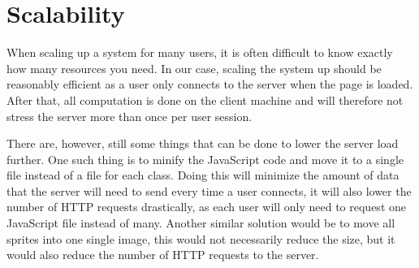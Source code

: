 \section{Scalability}
When scaling up a system for many users, it is often difficult to know exactly how many resources you need. In our case, scaling the system up should be reasonably efficient as a user only connects to the server when the page is loaded. After that, all computation is done on the client machine and will therefore not stress the server more than once per user session.\newline

There are, however, still some things that can be done to lower the server load further. One such thing is to minify the JavaScript code and move it to a single file instead of a file for each class. Doing this will minimize the amount of data that the server will need to send every time a user connects, it will also lower the number of HTTP requests drastically, as each user will only need to request one JavaScript file instead of many. Another similar solution would be to move all sprites into one single image, this would not necessarily reduce the size, but it would also reduce the number of HTTP requests to the server.